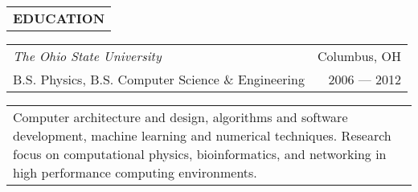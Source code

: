 \begin{tabularx}{\textwidth}{L}
    \textbf{EDUCATION}
\end{tabularx}

\begin{small}

\begin{tabularx}{\textwidth}{L R}
    \normalsize\textit{The Ohio State University} & Columbus, OH \\
    B.S. Physics, B.S. Computer Science \& Engineering & 2006 --- 2012 \\
\end{tabularx}
\begin{tabularx}{\textwidth}{X}
    \vspace{1pt}
    Computer architecture and design, algorithms and software development, machine learning and numerical techniques.
    Research focus on computational physics, bioinformatics, and networking in high performance computing environments.
\end{tabularx}

\end{small}

